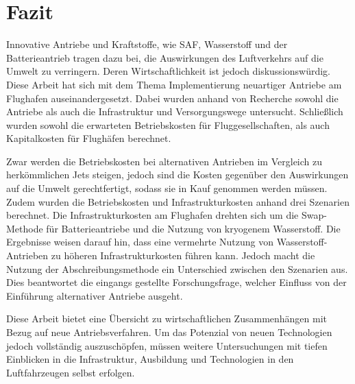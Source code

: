 \chapter{Fazit}
\label{ch:Fazit}
Innovative Antriebe und Kraftstoffe, wie SAF, Wasserstoff und der Batterieantrieb tragen dazu bei, die Auswirkungen des Luftverkehrs auf die Umwelt zu verringern.
Deren Wirtschaftlichkeit ist jedoch diskussionswürdig.
Diese Arbeit hat sich mit dem Thema Implementierung neuartiger Antriebe am Flughafen auseinandergesetzt. 
Dabei wurden anhand von Recherche sowohl die Antriebe als auch die Infrastruktur und Versorgungswege untersucht.
Schließlich wurden sowohl die erwarteten Betriebskosten für Fluggesellschaften, als auch Kapitalkosten für Flughäfen berechnet.

Zwar werden die Betriebskosten bei alternativen Antrieben im Vergleich zu herkömmlichen Jets steigen, 
jedoch sind die Kosten gegenüber den Auswirkungen auf die Umwelt gerechtfertigt, sodass sie in Kauf genommen werden müssen.
Zudem wurden die Betriebskosten und Infrastrukturkosten anhand drei Szenarien berechnet. 
Die Infrastrukturkosten am Flughafen drehten sich um die Swap-Methode für Batterieantriebe 
und die Nutzung von kryogenem Wasserstoff.
Die Ergebnisse weisen darauf hin, dass eine vermehrte Nutzung von Wasserstoff-Antrieben zu 
höheren Infrastrukturkosten führen kann.
Jedoch macht die Nutzung der Abschreibungsmethode ein Unterschied zwischen den Szenarien aus. 
Dies beantwortet die eingangs gestellte Forschungsfrage, welcher Einfluss von der Einführung alternativer Antriebe ausgeht.

Diese Arbeit bietet eine Übersicht zu wirtschaftlichen Zusammenhängen mit Bezug auf neue Antriebsverfahren.
Um das Potenzial von neuen Technologien jedoch vollständig auszuschöpfen, müssen weitere Untersuchungen 
mit tiefen Einblicken in die Infrastruktur, Ausbildung und Technologien in den Luftfahrzeugen selbst erfolgen.
